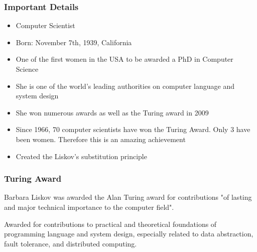 \documentclass{beamer}
\begin{document}
\begin{frame}
\frametitle{Important Details}
\begin{itemize}
\item Computer Scientist
\item Born: November 7th, 1939, California
\item One of the first women in the USA to be awarded a PhD in Computer Science
\item She is one of the world's leading authorities on computer language and system design
\item She won numerous awards as well as the Turing award in 2009
\item Since 1966, 70 computer scientists have won the Turing Award. Only 3 have been women. Therefore this is an amazing achievement
\item Created the Liskov's substitution principle
\end{itemize}
\end{frame}


\begin{frame}
\frametitle{Turing Award}
Barbara Liskov was awarded the Alan Turing award for  contributions "of lasting and major technical importance to the computer field". 

\vspace{5mm} %

Awarded for contributions to practical and theoretical foundations of programming language and system design, especially related to data abstraction, fault tolerance, and distributed computing. 

\vspace{5mm}

\end{frame}

\end{document}
